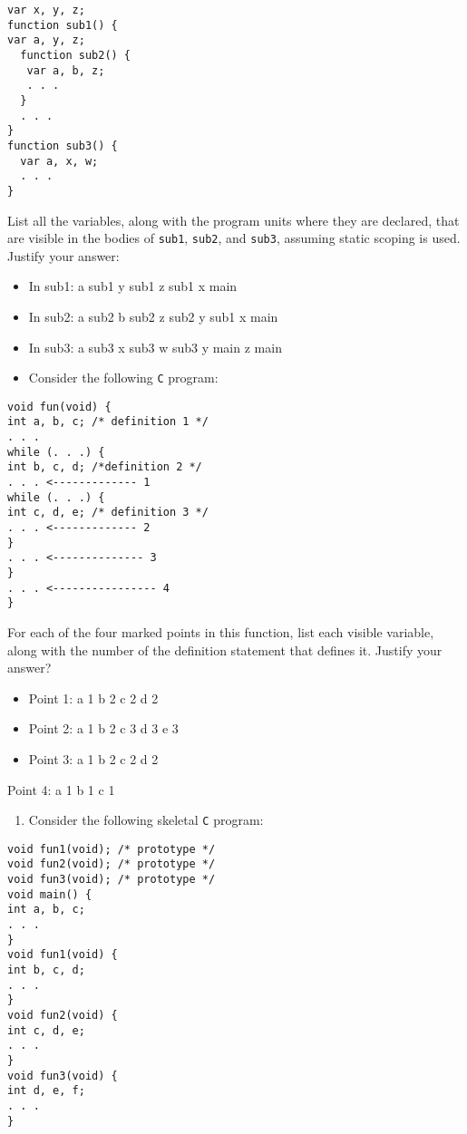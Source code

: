 \documentclass[11pt]{article}
\begin{document}
\begin{verbatim}
var x, y, z;
function sub1() {
var a, y, z;
  function sub2() {
   var a, b, z;
   . . .
  }
  . . .
}
function sub3() {
  var a, x, w;
  . . .
}
\end{verbatim}

List all the variables, along with the program units where they are declared,
that are visible in the bodies of \texttt{sub1}, \texttt{sub2}, and \texttt{sub3}, assuming
static scoping is used. Justify your answer:

\begin{itemize}
\item In sub1:
a     sub1
y     sub1
z     sub1
x     main
\item In sub2:
a sub2
b     sub2
z     sub2
y     sub1
x     main
\item In sub3:
a sub3
x sub3
w sub3
y main
z main

\item Consider the following \texttt{C} program:
\end{itemize}

\begin{verbatim}
void fun(void) {
int a, b, c; /* definition 1 */
. . .
while (. . .) {
int b, c, d; /*definition 2 */
. . . <------------- 1
while (. . .) {
int c, d, e; /* definition 3 */
. . . <------------- 2
}
. . . <-------------- 3
}
. . . <---------------- 4
}
\end{verbatim}

For each of the four marked points in this function, list each visible variable,
along with the number of the definition statement that defines it. Justify your
answer?


\begin{itemize}
\item Point 1:
a 1
b 2
c 2
d 2
\item Point 2:
a 1
b 2
c 3
d 3
e 3
\item Point 3:
a 1
b 2
c 2
d 2
\end{itemize}
Point 4:
  a 1
  b 1
  c 1


\begin{enumerate}
\item Consider the following skeletal \texttt{C} program:
\end{enumerate}

\begin{verbatim}
void fun1(void); /* prototype */
void fun2(void); /* prototype */
void fun3(void); /* prototype */
void main() {
int a, b, c;
. . .
}
void fun1(void) {
int b, c, d;
. . .
}
void fun2(void) {
int c, d, e;
. . .
}
void fun3(void) {
int d, e, f;
. . .
}
\end{verbatim}
\end{document}
